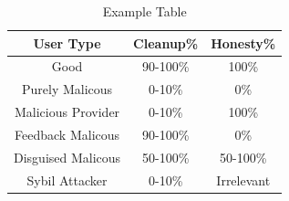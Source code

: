 \documentclass{sig-alternate}
\begin{document}

\begin{table}[htb!]
	\begin{center}
  \begin{tabular}{| c | c | c |}
    \hline
    \textbf{User Type} & \textbf{Cleanup\%} & \textbf{Honesty\%} \\ \hline
    Good & 90-100\% & 100\% \\ \hline
    Purely Malicous & 0-10\% & 0\% \\ \hline
		Malicious Provider & 0-10\% & 100\% \\ \hline
		Feedback Malicous & 90-100\% & 0\% \\ \hline
		Disguised Malicous & 50-100\% & 50-100\% \\ \hline
		Sybil Attacker & 0-10\% & Irrelevant \\ \hline
  \end{tabular}
	\caption{Example Table}
  \label{tab:some_table}
	\vspace{-10pt}
	\end{center}
\end{table}
\end{document}
